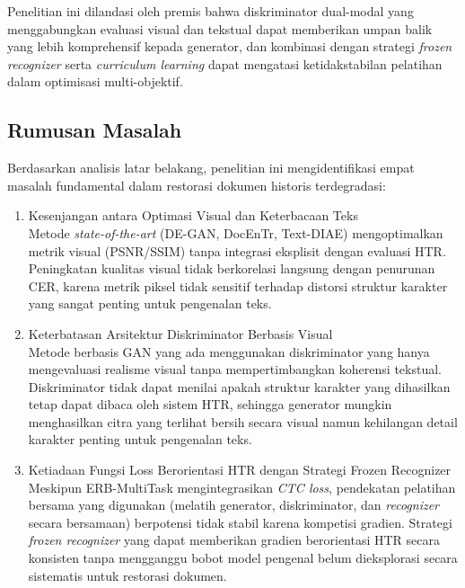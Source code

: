 \documentclass[12pt,a4paper]{article}
\begin{document}
Penelitian ini dilandasi oleh premis bahwa diskriminator dual-modal yang menggabungkan evaluasi visual dan tekstual dapat memberikan umpan balik yang lebih komprehensif kepada generator, dan kombinasi dengan strategi \textit{frozen recognizer} serta \textit{curriculum learning} dapat mengatasi ketidakstabilan pelatihan dalam optimisasi multi-objektif.

\subsection{Rumusan Masalah}
\label{subsec:rumusan-masalah}

Berdasarkan analisis latar belakang, penelitian ini mengidentifikasi empat masalah fundamental dalam restorasi dokumen historis terdegradasi:

\begin{enumerate}[leftmargin=1.5em, labelsep=0.5em, itemindent=0pt, noitemsep, topsep=0pt]
      \item Kesenjangan antara Optimasi Visual dan Keterbacaan Teks \\
            Metode \textit{state-of-the-art} (DE-GAN, DocEnTr, Text-DIAE) mengoptimalkan metrik visual (PSNR/SSIM) tanpa integrasi eksplisit dengan evaluasi HTR. Peningkatan kualitas visual tidak berkorelasi langsung dengan penurunan CER, karena metrik piksel tidak sensitif terhadap distorsi struktur karakter yang sangat penting untuk pengenalan teks.

      \item Keterbatasan Arsitektur Diskriminator Berbasis Visual \\
            Metode berbasis GAN yang ada menggunakan diskriminator yang hanya mengevaluasi realisme visual tanpa mempertimbangkan koherensi tekstual. Diskriminator tidak dapat menilai apakah struktur karakter yang dihasilkan tetap dapat dibaca oleh sistem HTR, sehingga generator mungkin menghasilkan citra yang terlihat bersih secara visual namun kehilangan detail karakter penting untuk pengenalan teks.

      \item Ketiadaan Fungsi Loss Berorientasi HTR dengan Strategi Frozen Recognizer \\
            Meskipun ERB-MultiTask mengintegrasikan \textit{CTC loss}, pendekatan pelatihan bersama yang digunakan (melatih generator, diskriminator, dan \textit{recognizer} secara bersamaan) berpotensi tidak stabil karena kompetisi gradien. Strategi \textit{frozen recognizer} yang dapat memberikan gradien berorientasi HTR secara konsisten tanpa mengganggu bobot model pengenal belum dieksplorasi secara sistematis untuk restorasi dokumen.


\end{enumerate}
\end{document}

